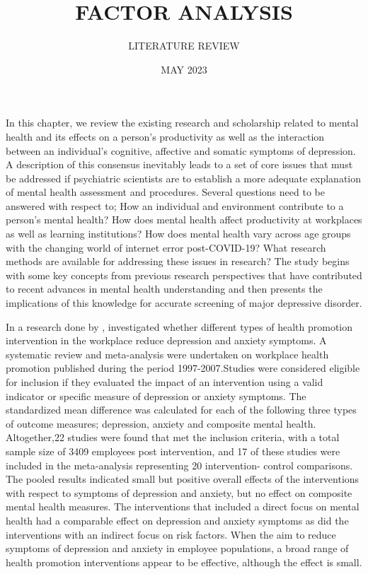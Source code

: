 \documentclass{beamer}
\title{FACTOR ANALYSIS}
\subtitle{LITERATURE REVIEW}
\date{MAY 2023}
\begin{document}
	\maketitle
	\begin{frame}
		In this chapter, we review the existing research and scholarship related to mental health and its effects on a person’s productivity as well as the interaction between an individual’s cognitive, affective and somatic symptoms of depression. A description of this consensus inevitably leads to a set of core issues that must be addressed if psychiatric scientists are to establish a more adequate explanation of mental health assessment and procedures. Several questions need to be answered with respect to; How an individual and environment contribute to a person’s mental health? How does mental health affect productivity at workplaces as well as learning institutions? How does mental health vary across age groups with the changing world of internet error post-COVID-19? What research methods are available for addressing these issues in research? The study begins with some key concepts from previous research perspectives that have contributed to recent advances in mental health understanding and then presents the implications of this knowledge for accurate screening of major depressive disorder.
	\end{frame}
\begin{frame}
	In a research done by \cite{martin2009meta}, investigated whether different types of health promotion intervention in the workplace reduce depression and anxiety symptoms. A systematic review and meta-analysis were undertaken on workplace health promotion published during the period 1997-2007.Studies were considered eligible for inclusion if they evaluated the impact of an intervention using a valid indicator or specific measure of depression or anxiety symptoms. The standardized mean difference was calculated for each of the following three types of outcome measures; depression, anxiety and composite mental health. Altogether,22 studies were found that met the inclusion criteria, with a total sample size of 3409 employees post intervention, and 17 of these studies were included in the meta-analysis representing 20 intervention- control comparisons. The pooled results indicated small but positive overall effects of the interventions with respect to symptoms of depression and anxiety, but no effect on composite mental health measures. The interventions that included a direct focus on mental health had a comparable effect on depression and anxiety symptoms as did the interventions with an indirect focus on risk factors. When the aim to reduce symptoms of depression and anxiety in employee populations, a broad range of health promotion interventions appear to be effective, although the effect is small.
\end{frame}
\end{document}
